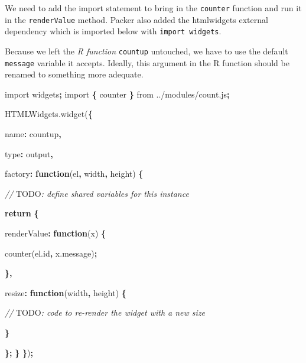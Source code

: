 \documentclass[
]{krantz}
\makeatletter
\newenvironment{Shaded}{\begin{snugshade}}{\end{snugshade}}
\newcommand{\AlertTok}[1]{\textcolor[rgb]{0.33,0.33,0.33}{#1}}
\newcommand{\AttributeTok}[1]{\textcolor[rgb]{0.61,0.61,0.61}{#1}}
\newcommand{\CommentTok}[1]{\textcolor[rgb]{0.37,0.37,0.37}{\textit{#1}}}
\newcommand{\ControlFlowTok}[1]{\textcolor[rgb]{0.27,0.27,0.27}{\textbf{#1}}}
\newcommand{\DataTypeTok}[1]{\textcolor[rgb]{0.27,0.27,0.27}{#1}}
\newcommand{\ImportTok}[1]{#1}
\newcommand{\KeywordTok}[1]{\textcolor[rgb]{0.27,0.27,0.27}{\textbf{#1}}}
\newcommand{\NormalTok}[1]{#1}
\newcommand{\OperatorTok}[1]{\textcolor[rgb]{0.43,0.43,0.43}{\textbf{#1}}}
\newcommand{\StringTok}[1]{\textcolor[rgb]{0.5,0.5,0.5}{#1}}
\newcommand{\VariableTok}[1]{\textcolor[rgb]{0,0,0}{#1}}
\newenvironment{kframe}{%
\medskip{}
\setlength{\fboxsep}{.8em}
 \def\at@end@of@kframe{}%
 \ifinner\ifhmode%
  \def\at@end@of@kframe{\end{minipage}}%
  \begin{minipage}{\columnwidth}%
 \fi\fi%
 \def\FrameCommand##1{\hskip\@totalleftmargin \hskip-\fboxsep
 \colorbox{shadecolor}{##1}\hskip-\fboxsep
     \hskip-\linewidth \hskip-\@totalleftmargin \hskip\columnwidth}%
 \MakeFramed {\advance\hsize-\width
   \@totalleftmargin\z@ \linewidth\hsize
   \@setminipage}}%
 {\par\unskip\endMakeFramed%
 \at@end@of@kframe}
\renewenvironment{Shaded}{\begin{kframe}}{\end{kframe}}
\makeatother
\begin{document}
We need to add the import statement to bring in the \texttt{counter} function and run it in the \texttt{renderValue} method. Packer also added the htmlwidgets external dependency which is imported below with \texttt{import\ \textquotesingle{}widgets\textquotesingle{}}.

Because we left the \emph{R function} \texttt{countup} untouched, we have to use the default \texttt{message} variable it accepts. Ideally, this argument in the R function should be renamed to something more adequate.

\begin{Shaded}
\begin{Highlighting}[]
\ImportTok{import} \StringTok{\textquotesingle{}widgets\textquotesingle{}}\OperatorTok{;}
\ImportTok{import} \OperatorTok{\{}\NormalTok{ counter }\OperatorTok{\}} \ImportTok{from} \StringTok{\textquotesingle{}../modules/count.js\textquotesingle{}}\OperatorTok{;} 

\VariableTok{HTMLWidgets}\NormalTok{.}\AttributeTok{widget}\NormalTok{(}\OperatorTok{\{}

  \DataTypeTok{name}\OperatorTok{:} \StringTok{\textquotesingle{}countup\textquotesingle{}}\OperatorTok{,}

  \DataTypeTok{type}\OperatorTok{:} \StringTok{\textquotesingle{}output\textquotesingle{}}\OperatorTok{,}

  \DataTypeTok{factory}\OperatorTok{:} \KeywordTok{function}\NormalTok{(el}\OperatorTok{,}\NormalTok{ width}\OperatorTok{,}\NormalTok{ height) }\OperatorTok{\{}

    \CommentTok{// }\AlertTok{TODO}\CommentTok{: define shared variables for this instance}

    \ControlFlowTok{return} \OperatorTok{\{}

      \DataTypeTok{renderValue}\OperatorTok{:} \KeywordTok{function}\NormalTok{(x) }\OperatorTok{\{}

        \AttributeTok{counter}\NormalTok{(}\VariableTok{el}\NormalTok{.}\AttributeTok{id}\OperatorTok{,} \VariableTok{x}\NormalTok{.}\AttributeTok{message}\NormalTok{)}\OperatorTok{;}

      \OperatorTok{\},}

      \DataTypeTok{resize}\OperatorTok{:} \KeywordTok{function}\NormalTok{(width}\OperatorTok{,}\NormalTok{ height) }\OperatorTok{\{}

        \CommentTok{// }\AlertTok{TODO}\CommentTok{: code to re{-}render the widget with a new size}

      \OperatorTok{\}}

    \OperatorTok{\};}
  \OperatorTok{\}}
\OperatorTok{\}}\NormalTok{)}\OperatorTok{;}
\end{Highlighting}
\end{Shaded}
\end{document}
